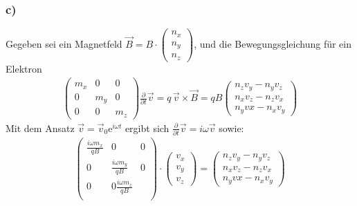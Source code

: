 \subsubsection*{c)}
Gegeben sei ein Magnetfeld $\vec B = B \cdot \begin{pmatrix} n_x \\n_y \\n_z \end{pmatrix}$,
und die Bewegungsgleichung für ein Elektron
\begin{align*}
\begin{pmatrix} m_x&0&0 \\0&m_y&0 \\0&0&m_z\end{pmatrix} \frac{\partial}{\partial t} \vec v=
 q \, \vec v \times \vec B = q B \begin{pmatrix}n_z v_y - n_y v_z \\ n_x v_z - n_z v_x \\ n_y v x - n_x v_y\end{pmatrix}
\end{align*}
Mit dem Ansatz $\vec v = \vec v_0 \mathrm e^{i \omega t}$ ergibt sich
$\frac{\partial}{\partial t} \vec v = i \omega \vec v$ sowie:
\begin{align*}
\begin{pmatrix}\frac{i \omega m_x}{q B}&0&0\\0&\frac{i \omega m_y}{q B}&0\\0&0\frac{i \omega m_z}{q B}\\\end{pmatrix}
  \cdot \begin{pmatrix}v_x\\v_y \\ v_z\end{pmatrix} =\begin{pmatrix}n_z v_y - n_y v_z \\ n_x v_z - n_z v_x \\ n_y v x - n_x v_y\end{pmatrix}
\end{align*}


